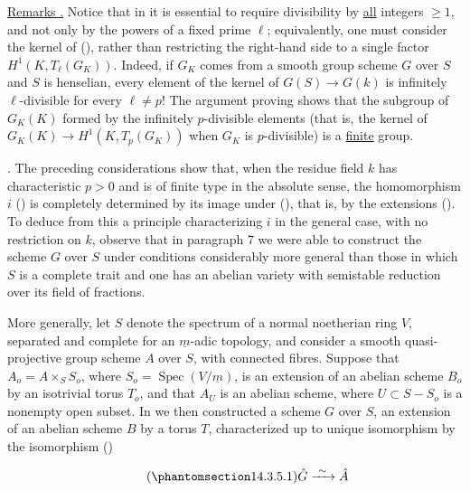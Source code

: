 \medskip
\noindent
\underline{Remarks .}  Notice that in  it is essential
to require divisibility by \underline{all} integers $\geq1$, and not
only by the powers of a fixed prime $\ell$; equivalently, one must
consider the kernel of (), rather than restricting the right-hand
side to a single factor $H^1(K,T_\ell(G_K))$.  Indeed, if $G_K$ comes
from a smooth group scheme $G$ over $S$ and $S$ is henselian, every
element of the kernel of $G(S)\longrightarrow G(k)$ is infinitely
$\ell$-divisible for every $\ell\neq p$!  The argument proving 
shows that the subgroup of $G_K(K)$ formed by the infinitely
$p$-divisible elements (that is, the kernel of
$G_K(K)\longrightarrow H^1(K,T_p(G_K))$ when $G_K$ is $p$-divisible)
is a \underline{finite} group.

\medskip
\noindent
{}. The preceding considerations show that, when the residue
field $k$ has characteristic $p>0$ and is of finite type in the
absolute sense, the homomorphism $i$ () is completely determined
by its image under (), that is, by the extensions ().  To
deduce from this a principle characterizing $i$ in the general case,
with no restriction on $k$, observe that in paragraph 7 we were able to
construct the scheme $G$ over $S$ under conditions considerably more
general than those in which $S$ is a complete trait and one has an
abelian variety with semistable reduction over its field of fractions.

More generally, let $S$ denote the spectrum of a normal noetherian ring
$V$, separated and complete for an $\underline m$-adic topology, and
consider a smooth quasi-projective group scheme $A$ over $S$, with
connected fibres.  Suppose that
$A_o=A\times_S S_o$, where
$S_o=\operatorname{Spec}(V/\underline m)$, is an extension of an
abelian scheme $B_o$ by an isotrivial torus $T_o$, and that $A_U$ is an
abelian scheme, where $U\subset S-S_o$ is a nonempty open subset.  In
 we then constructed a scheme $G$ over $S$, an extension of an
abelian scheme $B$ by a torus $T$, characterized up to unique
isomorphism by the isomorphism ()

\begin{equation}\tag{\SGARefTarget{sga7.sga7i.eix.n14-3-5-1}{14.3.5.1}}
 \hat G\xrightarrow{\ \sim\ }\hat A
\end{equation}


